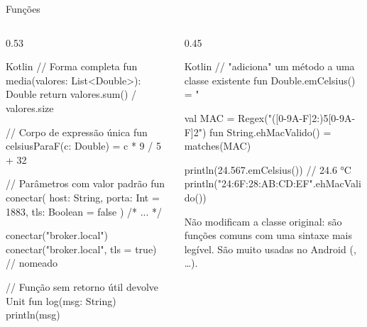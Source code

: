 \documentclass[aspectratio=169,10pt]{beamer}
\begin{document}
\begin{frame}[fragile]{Funções}
  \begin{columns}[T]
    \begin{column}{0.53\textwidth}
\begin{codigo}[title=Funcoes.kt]{Kotlin}
// Forma completa
fun media(valores: List<Double>): Double {
  return valores.sum() / valores.size
}

// Corpo de expressão única
fun celsiusParaF(c: Double) = c * 9 / 5 + 32

// Parâmetros com valor padrão
fun conectar(
  host: String,
  porta: Int = 1883,
  tls: Boolean = false
) { /* ... */ }

conectar("broker.local")
conectar("broker.local", tls = true)  // nomeado

// Função sem retorno útil devolve Unit
fun log(msg: String) { println(msg) }
\end{codigo}
    \end{column}
    \begin{column}{0.45\textwidth}
\begin{codigo}[title=Funções de extensão]{Kotlin}
// "adiciona" um método a uma classe existente
fun Double.emCelsius() = "%

val MAC = Regex("([0-9A-F]{2}:){5}[0-9A-F]{2}")
fun String.ehMacValido() = matches(MAC)

println(24.567.emCelsius())   // 24.6 °C
println("24:6F:28:AB:CD:EF".ehMacValido())
\end{codigo}
      \begin{conceito}[Extensões]
        Não modificam a classe original: são funções comuns com uma sintaxe mais legível. São muito usadas no Android (, \ldots).
      \end{conceito}
    \end{column}
  \end{columns}
\end{frame}
\end{document}

